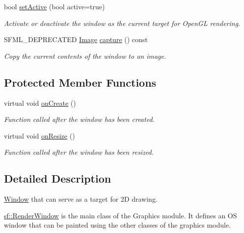 \begin{DoxyCompactItemize}
bool \mbox{\hyperlink{classsf_1_1_render_window_aee6c53eced675e885931eb3e91f11155}{set\+Active}} (bool active=true)
\begin{DoxyCompactList}\small\item\em Activate or deactivate the window as the current target for Open\+GL rendering. \end{DoxyCompactList}\item 
S\+F\+M\+L\+\_\+\+D\+E\+P\+R\+E\+C\+A\+T\+ED \mbox{\hyperlink{classsf_1_1_image}{Image}} \mbox{\hyperlink{classsf_1_1_render_window_a370137abe81f6b7d62b600ceeccd54d3}{capture}} () const
\begin{DoxyCompactList}\small\item\em Copy the current contents of the window to an image. \end{DoxyCompactList}\end{DoxyCompactItemize}
\subsection*{Protected Member Functions}
\begin{DoxyCompactItemize}
\item 
virtual void \mbox{\hyperlink{classsf_1_1_render_window_a5bef0040b0fa87bed9fbd459c980d53a}{on\+Create}} ()
\begin{DoxyCompactList}\small\item\em Function called after the window has been created. \end{DoxyCompactList}\item 
virtual void \mbox{\hyperlink{classsf_1_1_render_window_a5c85fe482313562d33ffd24a194b6fef}{on\+Resize}} ()
\begin{DoxyCompactList}\small\item\em Function called after the window has been resized. \end{DoxyCompactList}\end{DoxyCompactItemize}


\subsection{Detailed Description}
\mbox{\hyperlink{classsf_1_1_window}{Window}} that can serve as a target for 2D drawing. 

\begin{DoxyVerb}\end{DoxyVerb}


\mbox{\hyperlink{classsf_1_1_render_window}{sf\+::\+Render\+Window}} is the main class of the Graphics module. It defines an OS window that can be painted using the other classes of the graphics module.

